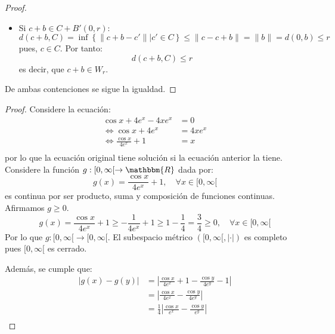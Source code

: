 \documentclass[12pt]{report}
\theoremstyle{largebreak}
\newcommand\abs[1]{\ensuremath{\left|#1\right|}}
\newcommand\cf[3]{\ensuremath{#1:#2\rightarrow#3}}
\newcommand{\bbm}[1]{\ensuremath{\mathbbm{#1}}}
\begin{document}
\begin{proof}
\begin{itemize}
            \item Si $c+b\in C+B'(0,r)$:
            \begin{equation*}
                d(c+b,C)=\inf\left\{\|c+b-c' \|\Big|c'\in C \right\}\leq \|c-c+b \|=\|b\|=d(0,b)\leq r
            \end{equation*}
            pues, $c\in C$. Por tanto:
            \begin{equation*}
                d(c+b,C)\leq r
            \end{equation*}
            es decir, que $c+b\in W_r$.
        \end{itemize}
        De ambas contenciones se sigue la igualdad.
    \end{proof}

    \begin{proof}
        Considere la ecuación:
        \begin{equation*}
            \begin{split}
                \cos x+4e^x-4xe^x&=0\\
                \iff \cos x+4e^x&=4xe^x\\
                \iff \frac{\cos x}{4e^x}+1&=x\\
            \end{split}
        \end{equation*}
        por lo que la ecuación original tiene solución si la ecuación anterior la tiene. Considere la función $\cf{g}{[0,\infty[}{\bbm{R}}$ dada por:
        \begin{equation*}
            g(x)=\frac{\cos x}{4e^x}+1,\quad\forall x\in[0,\infty[
        \end{equation*}
        es continua por ser producto, suma y composición de funciones continuas. Afirmamos $g\geq0$.
        \begin{equation*}
            g(x)=\frac{\cos x}{4e^x}+1\geq-\frac{1}{4e^x}+1\geq 1-\frac{1}{4}=\frac{3}{4}\geq0,\quad\forall x\in[0,\infty[
        \end{equation*}
        Por lo que $\cf{g}{[0,\infty[}{[0,\infty[}$. El subespacio métrico $([0,\infty[,\abs{\cdot})$ es completo pues $[0,\infty[$ es cerrado.

        Además, se cumple que:
        \begin{equation*}
            \begin{split}
                \abs{g(x)-g(y)}&=\abs{\frac{\cos x}{4e^x}+1-\frac{\cos y}{4e^y}-1 }\\
                &=\abs{\frac{\cos x}{4e^x}-\frac{\cos y}{4e^y}}\\
                &=\frac{1}{4}\abs{\frac{\cos x}{e^x}-\frac{\cos y}{e^y}}\\
            \end{split}
        \end{equation*}


\end{proof}
\end{document}
